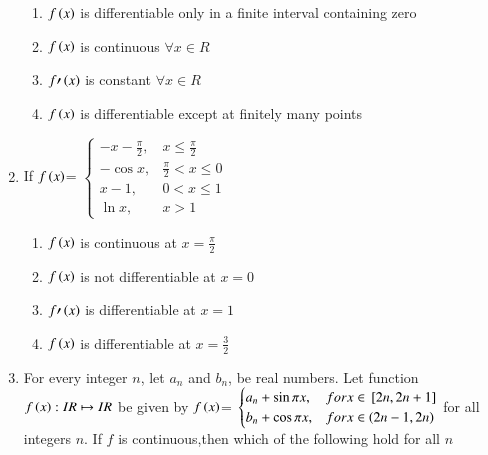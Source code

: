 \documentclass[journal,12pt,twocolumn]{IEEEtran}
\theoremstyle{remark}
\begin{document}
\begin{enumerate}
    \hfill 
    {}
    
    \begin{enumerate}[label=(\alph*)]
        
        \item $f\left(x\right)$ is differentiable only in a finite interval containing zero 
        \item $f\left(x\right)$ is continuous $\forall x\in R$
        \item $f\prime\left(x\right)$ is constant $\forall x\in R$
        \item $f\left(x\right)$ is differentiable except at finitely many points 
    \end{enumerate}


    \item 
    If $f\left(x\right)$= 
    $\begin{cases}
        -x-\frac{\pi}{2}, & x\leq \frac{\pi}{2} \\
        -\cos x, & \frac{\pi}{2}<x\leq 0 \\
        x-1, & 0<x\leq1 \\
        \ln x, & x>1
    \end{cases}$ 

    \hfill 
    {}
    
    \begin{enumerate}[label=(\alph*)]
        
        \item $f\left(x\right)$ is continuous at $x=\frac{\pi}{2}$
        \item $f\left(x\right)$ is not differentiable at $x=0$
        \item $f\prime\left(x\right)$ is differentiable at $x=1$
        \item $f\left(x\right)$ is differentiable at $x=\frac{3}{2}$
    \end{enumerate}


    \item 
    For every integer $n$, let $a_n$ and $b_n$, be real numbers. Let function $f\left(x\right): IR \mapsto IR$ be given by
    $f\left(x\right)$= 
    $\begin{cases}
       a_n+\sin\pi x, & for x\in {}\left[2n,2n+1\right] \\
       b_n+\cos\pi x, & for x\in \left(2n-1,2n\right)
    \end{cases}$
    for all integers $n$. If $f$ is continuous,then which of the following hold for all $n$ 

    \hfill 
    {}
    

\end{enumerate}
\end{document}
